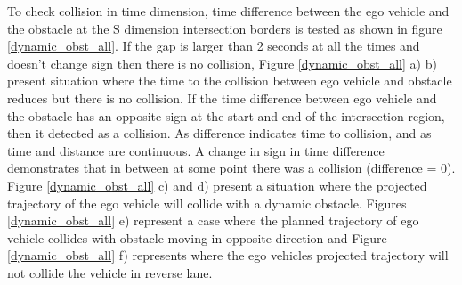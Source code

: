 To check collision in time dimension, time difference between the ego vehicle and the obstacle at the S dimension intersection borders is tested as shown in figure \ref{dynamic_obst_all}. If the gap is larger than 2 seconds at all the times and doesn't change sign then there is no collision, Figure \ref{dynamic_obst_all} a) b) present situation where the time to the collision between ego vehicle and obstacle reduces but there is no collision. If the time difference between ego vehicle and the obstacle has an opposite sign at the start and end of the intersection region, then it detected as a collision. As difference indicates time to collision, and as time and distance are continuous. A change in sign in time difference demonstrates that in between at some point there was a collision (difference = 0). Figure \ref{dynamic_obst_all} c) and d) present a situation where the projected trajectory of the ego vehicle will collide with a dynamic obstacle. Figures \ref{dynamic_obst_all} e) represent a case where the planned trajectory of ego vehicle collides with obstacle moving in opposite direction and Figure \ref{dynamic_obst_all} f) represents where the ego vehicles projected trajectory will not collide the vehicle in reverse lane.


